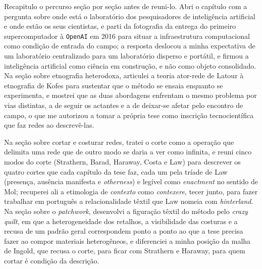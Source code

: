 Recapitulo o percurso seção por seção antes de reuni-lo. Abri o capítulo com a pergunta sobre onde está o laboratório dos pesquisadores de inteligência artificial e onde estão os seus cientistas, e parti da fotografia da entrega do primeiro supercomputador à \texttt{OpenAI} em 2016 para situar a infraestrutura computacional como condição de entrada do campo; a resposta deslocou a minha expectativa de um laboratório centralizado para um laboratório disperso e portátil, e firmou a inteligência artificial como ciência em construção, e não como objeto consolidado. Na seção sobre etnografia heterodoxa, articulei a teoria ator-rede de Latour à etnografia de Kofes para sustentar que o método se ensaia enquanto se experimenta, e mostrei que as duas abordagens enfrentam o mesmo problema por vias distintas, a de seguir os actantes e a de deixar-se afetar pelo encontro de campo, o que me autorizou a tomar a própria tese como inscrição tecnocientífica que faz redes ao descrevê-las.

Na seção sobre cortar e costurar redes, tratei o corte como a operação que delimita uma rede que de outro modo se daria a ver como infinita, e reuni cinco modos do corte (Strathern, Barad, Haraway, Costa e Law) para descrever os quatro cortes que cada capítulo da tese faz, cada um pela tríade de Law (presença, ausência manifesta e \textit{otherness}) e legível como \textit{enactment} no sentido de Mol; recuperei ali a etimologia de \textit{contexto} como \textit{contexere}, tecer junto, para fazer trabalhar em português a relacionalidade têxtil que Law nomeia com \textit{hinterland}. Na seção sobre o \textit{patchwork}, desenvolvi a figuração têxtil do método pelo \textit{crazy quilt}, em que a heterogeneidade dos retalhos, a visibilidade das costuras e a recusa de um padrão geral correspondem ponto a ponto ao que a tese precisa fazer ao compor materiais heterogêneos, e diferenciei a minha posição da malha de Ingold, que recusa o corte, para ficar com Strathern e Haraway, para quem cortar é condição da descrição.

